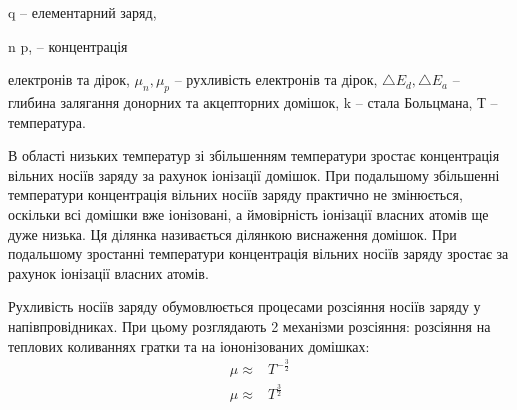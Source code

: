 \documentclass[a4paper,14pt]{extreport}
\begin{document}
  q – елементарний заряд,

  n p, – концентрація

  електронів та дірок, $\mu_n,\mu_p$ – рухливість електронів та дірок, $\triangle E_d, \triangle E_a$ – глибина
  залягання донорних та акцепторних домішок, k – стала Больцмана, Т – температура.\par

  В області низьких температур зі збільшенням температури зростає
  концентрація вільних носіїв заряду за рахунок іонізації домішок. При подальшому
  збільшенні температури концентрація вільних носіїв заряду практично не
  змінюється, оскільки всі домішки вже іонізовані, а ймовірність іонізації власних
  атомів ще дуже низька. Ця ділянка називається ділянкою виснаження домішок.
  При подальшому зростанні температури концентрація вільних носіїв заряду
  зростає за рахунок іонізації власних атомів.\par

  Рухливість носіїв заряду обумовлюється процесами розсіяння носіїв заряду
  у напівпровідниках. При цьому розглядають 2 механізми розсіяння: розсіяння на
  теплових коливаннях гратки та на іононізованих домішках:
  \begin{align}
  \mu\approx& T^{-\frac32}\\
  \mu\approx& T^{\frac32}
  \end{align}
\end{document}
